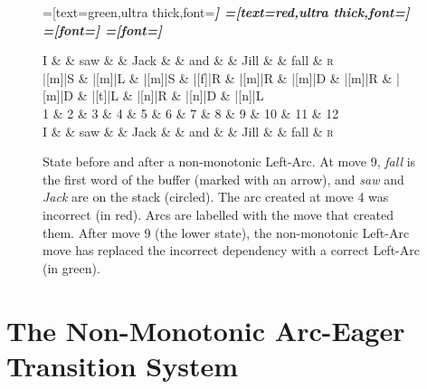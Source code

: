 \documentclass[11pt,letterpaper]{article}
\begin{document}
\begin{figure}
    \centering
    \begin{dependency}[theme=simple]
        =[text=green,ultra thick,font=\bfseries\itshape]
        =[text=red,ultra thick,font=\bfseries\itshape]
        =[font=\bfseries\itshape]
        =[font=\itshape]

        \begin{deptext}[column sep=.075cm, row sep=.1ex]
            I \&           \& saw \&          \& Jack       \& \& and     \&           \& Jill   \&  \& fall \& \textsc{r} \\
|[m]|S \& |[m]|L \& |[m]|S   \& |[f]|R \& |[m]|R \& |[m]|D \& |[m]|R \& |[m]|D \& |[t]|L \& |[n]|R \& |[n]|D \& |[n]|L \\
            1 \&     2       \& 3  \&   4      \& 5          \& 6 \& 7     \& 8 \& 9 \& 10 \& 11 \& 12 \\
    I \&           \& saw \&          \& Jack       \& \& and     \&           \& Jill   \&      \& fall \& \textsc{r} \\
        \end{deptext}
    
    
\end{dependency}
\caption{
    \small
    State before and after a non-monotonic Left-Arc.
    At move 9, \emph{fall} is the first word of the buffer (marked with an arrow),
    and \emph{saw} and \emph{Jack} are on the stack (circled). The arc created at move 4 was
    incorrect (in red). Arcs are labelled with the move that created them.
    After move 9 (the lower state), the non-monotonic Left-Arc move
    has replaced the incorrect dependency with a correct Left-Arc (in green).
\label{fig:clobber}}
\end{figure}



\section{The Non-Monotonic Arc-Eager Transition System}
\end{document}
